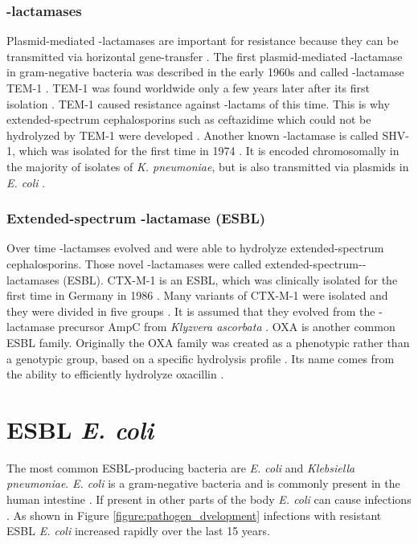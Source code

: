 \subsubsection{\textbeta-lactamases}
\label{section:resistance_mechanisms}
Plasmid-mediated \textbeta-lactamases are important for resistance because they can be transmitted via horizontal gene-transfer \cite{munita_mechanisms_2016}.  
The first plasmid-mediated \textbeta-lactamase in gram-negative bacteria was described in the early 1960s and called \textbeta-lactamase TEM-1  \cite{fernandes_-lactams:_2013}. TEM-1 was found worldwide only a few years later after its first isolation \cite{fernandes_-lactams:_2013}. TEM-1 caused resistance against \textbeta-lactams of this time.  This is why extended-spectrum cephalosporins such as ceftazidime which could not be hydrolyzed by TEM-1 were developed \cite{fernandes_-lactams:_2013}. Another known \textbeta-lactamase is called SHV-1, which was isolated for the first time in 1974 \cite{kuzin_structure_1999}. It is encoded chromosomally in the majority of isolates of \textit{K. pneumoniae}, but is also transmitted via plasmids in \textit{E. coli} \cite{kuzin_structure_1999}. \\

\subsubsection{Extended-spectrum \textbeta-lactamase (ESBL)}
Over time \textbeta-lactamses evolved and were able to hydrolyze extended-spectrum cephalosporins. Those novel \textbeta-lactamases were called extended-spectrum-\textbeta-lactamases (ESBL).  
CTX-M-1 is an ESBL, which was clinically isolated for the first time in Germany in 1986 \cite{bradford_extended-spectrum_2001}. Many variants of CTX-M-1 were isolated and they were divided in five groups \cite{fernandes_-lactams:_2013}.
It is assumed that they evolved from the \textbeta-lactamase precursor AmpC from \textit{Klyzvera ascorbata}  \cite{bradford_extended-spectrum_2001}. 
OXA is another common ESBL family. Originally the OXA family was created as a phenotypic rather than a genotypic group, based on a specific hydrolysis profile \cite{bradford_extended-spectrum_2001}. Its name comes from the ability to efficiently hydrolyze oxacillin \cite{bradford_extended-spectrum_2001}. \\

\section{ESBL \textit{E. coli}}
The most common ESBL-producing bacteria are \textit{E. coli} and \textit{Klebsiella pneumoniae}. \textit{E. coli} is a gram-negative bacteria and is commonly present in the human intestine \cite{swiss_hospitals_pathogens}. If present in other parts of the body \textit{E. coli} can cause infections \cite{swiss_hospitals_pathogens}. As shown in  Figure \ref{figure:pathogen_dvelopment} infections with resistant ESBL \textit{E. coli} increased rapidly over the last 15 years. 

